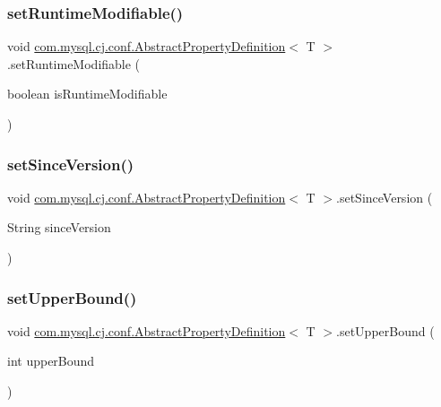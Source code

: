 \subsubsection{\texorpdfstring{set\+Runtime\+Modifiable()}{setRuntimeModifiable()}}
{\footnotesize\ttfamily void \mbox{\hyperlink{classcom_1_1mysql_1_1cj_1_1conf_1_1_abstract_property_definition}{com.\+mysql.\+cj.\+conf.\+Abstract\+Property\+Definition}}$<$ T $>$.set\+Runtime\+Modifiable (\begin{DoxyParamCaption}\item[{boolean}]{is\+Runtime\+Modifiable }\end{DoxyParamCaption})}

\mbox{\label{classcom_1_1mysql_1_1cj_1_1conf_1_1_abstract_property_definition_a14aedd7c097260f02b59a8f6cbec5d01}} 
\subsubsection{\texorpdfstring{set\+Since\+Version()}{setSinceVersion()}}
{\footnotesize\ttfamily void \mbox{\hyperlink{classcom_1_1mysql_1_1cj_1_1conf_1_1_abstract_property_definition}{com.\+mysql.\+cj.\+conf.\+Abstract\+Property\+Definition}}$<$ T $>$.set\+Since\+Version (\begin{DoxyParamCaption}\item[{String}]{since\+Version }\end{DoxyParamCaption})}

\mbox{\label{classcom_1_1mysql_1_1cj_1_1conf_1_1_abstract_property_definition_ab4baaef262eb2d3218853f84be8ce87b}} 
\subsubsection{\texorpdfstring{set\+Upper\+Bound()}{setUpperBound()}}
{\footnotesize\ttfamily void \mbox{\hyperlink{classcom_1_1mysql_1_1cj_1_1conf_1_1_abstract_property_definition}{com.\+mysql.\+cj.\+conf.\+Abstract\+Property\+Definition}}$<$ T $>$.set\+Upper\+Bound (\begin{DoxyParamCaption}\item[{int}]{upper\+Bound }\end{DoxyParamCaption})}



